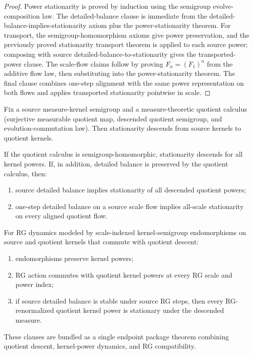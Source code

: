 \begin{proof}
Power stationarity is proved by induction using the semigroup evolve-composition law. The detailed-balance clause is immediate from the detailed-balance-implies-stationarity axiom plus the power-stationarity theorem. For transport, the semigroup-homomorphism axioms give power preservation, and the previously proved stationarity transport theorem is applied to each source power; composing with source detailed-balance-to-stationarity gives the transported-power clause. The scale-flow claims follow by proving $F_n=(F_1)^n$ from the additive flow law, then substituting into the power-stationarity theorem. The final clause combines one-step alignment with the same power representation on both flows and applies transported stationarity pointwise in scale.
\end{proof}

\begin{theorem}\label{thm:measure-kernel-quotient-rg-endpoint}
Fix a source measure-kernel semigroup and a measure-theoretic quotient calculus (surjective measurable quotient map, descended quotient semigroup, and evolution-commutation law). Then stationarity descends from source kernels to quotient kernels.

If the quotient calculus is semigroup-homomorphic, stationarity descends for all kernel powers. If, in addition, detailed balance is preserved by the quotient calculus, then:
\begin{enumerate}
\item source detailed balance implies stationarity of all descended quotient powers;
\item one-step detailed balance on a source scale flow implies all-scale stationarity on every aligned quotient flow.
\end{enumerate}

For RG dynamics modeled by scale-indexed kernel-semigroup endomorphisms on source and quotient kernels that commute with quotient descent:
\begin{enumerate}
\item endomorphisms preserve kernel powers;
\item RG action commutes with quotient kernel powers at every RG scale and power index;
\item if source detailed balance is stable under source RG steps, then every RG-renormalized quotient kernel power is stationary under the descended measure.
\end{enumerate}

These clauses are bundled as a single endpoint package theorem combining quotient descent, kernel-power dynamics, and RG compatibility.
\end{theorem}

